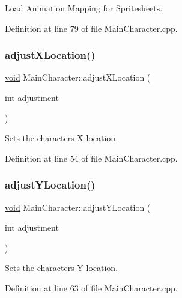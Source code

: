 Load Animation Mapping for Spritesheets. 



Definition at line 79 of file Main\+Character.\+cpp.

\mbox{\label{class_main_character_a7564a6018d48b1037649045d93d62381}} 
\subsubsection{\texorpdfstring{adjustXLocation()}{adjustXLocation()}}
{\footnotesize\ttfamily \mbox{\hyperlink{_s_d_l__opengles2__gl2ext_8h_ae5d8fa23ad07c48bb609509eae494c95}{void}} Main\+Character\+::adjust\+X\+Location (\begin{DoxyParamCaption}\item[{int}]{adjustment }\end{DoxyParamCaption})}



Sets the character\textquotesingle{}s X location. 



Definition at line 54 of file Main\+Character.\+cpp.

\mbox{\label{class_main_character_abd249b341c749175c078aebef0351a0e}} 
\subsubsection{\texorpdfstring{adjustYLocation()}{adjustYLocation()}}
{\footnotesize\ttfamily \mbox{\hyperlink{_s_d_l__opengles2__gl2ext_8h_ae5d8fa23ad07c48bb609509eae494c95}{void}} Main\+Character\+::adjust\+Y\+Location (\begin{DoxyParamCaption}\item[{int}]{adjustment }\end{DoxyParamCaption})}



Sets the character\textquotesingle{}s Y location. 



Definition at line 63 of file Main\+Character.\+cpp.

\mbox{\label{class_main_character_a7bfa07e6e592fbc04a0f346f9b327c34}} 
